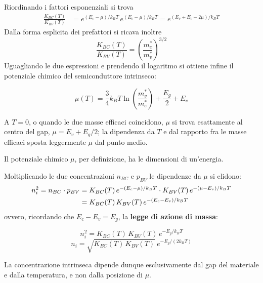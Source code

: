 Riordinando i fattori esponenziali si trova
\begin{align}
    \frac{K_{BC}(T)}{K_{BV}(T)} &= e^{(E_v - \mu)/k_B T} \, e^{(E_c - \mu)/k_B T} = e^{(E_v + E_c - 2\mu)/k_B T}
\end{align}
Dalla forma esplicita dei prefattori si ricava inoltre
\begin{equation}
    \frac{K_{BC}(T)}{K_{BV}(T)} = \left( \frac{m_e^*}{m_v^*} \right)^{3/2}
\end{equation}
Uguagliando le due espressioni e prendendo il logaritmo si ottiene infine il potenziale chimico del semiconduttore intrinseco:
\begin{importantbox}
    \begin{equation}
        \mu(T) = \frac{3}{4} k_B T \ln\!\left( \frac{m_v^*}{m_e^*} \right) + \frac{E_g}{2} + E_v
    \end{equation}
\end{importantbox}
A \( T = 0 \), o quando le due masse efficaci coincidono, \( \mu \) si trova esattamente al centro del gap, \( \mu = E_v + E_g/2 \); la dipendenza da \( T \) e dal rapporto fra le masse efficaci sposta leggermente \( \mu \) dal punto medio.

\begin{remark}
    Il potenziale chimico \( \mu \), per definizione, ha le dimensioni di un'energia.
\end{remark}

Moltiplicando le due concentrazioni \( n_{BC} \) e \( p_{BV} \) le dipendenze da \( \mu \) si elidono:
\begin{align}
    n_i^2 = n_{BC} \cdot p_{BV}
        &= K_{BC}(T) \, e^{-(E_c - \mu)/k_B T} \cdot K_{BV}(T) \, e^{-(\mu - E_v)/k_B T} \notag \\
        &= K_{BC}(T) \, K_{BV}(T) \, e^{-(E_c - E_v)/k_B T}
\end{align}
ovvero, ricordando che \( E_c - E_v = E_g \), la \textbf{legge di azione di massa}:
\begin{importantbox}
    \begin{equation}
        n_i^2 = K_{BC}(T) \, K_{BV}(T) \, e^{-E_g/k_B T}
    \end{equation}
    \begin{equation}
        n_i = \sqrt{K_{BC}(T) \, K_{BV}(T)} \ e^{-E_g/(2 k_B T)}
    \end{equation}
\end{importantbox}
La concentrazione intrinseca dipende dunque esclusivamente dal gap del materiale e dalla temperatura, e non dalla posizione di \( \mu \).


